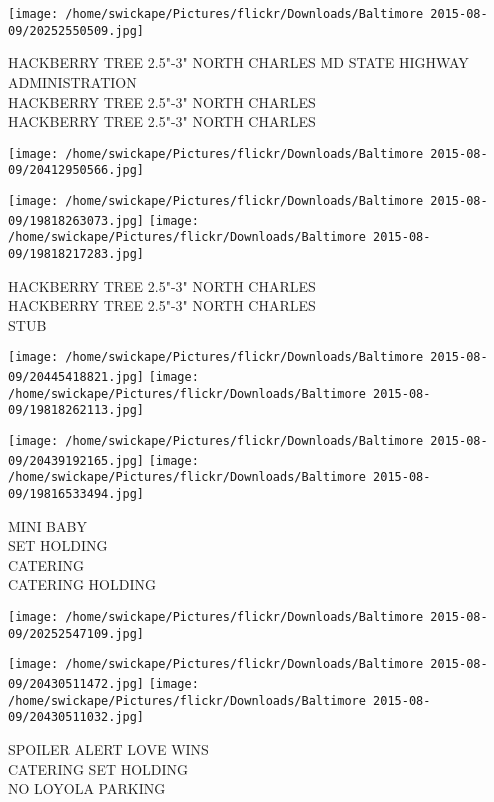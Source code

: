 \documentclass[10pt,letterpaper]{article}
\begin{document}
\texttt{[image: /home/swickape/Pictures/flickr/Downloads/Baltimore 2015-08-09/20252550509.jpg]}

HACKBERRY TREE 2.5"{-}3" NORTH CHARLES MD STATE HIGHWAY ADMINISTRATION\\
HACKBERRY TREE 2.5"{-}3" NORTH CHARLES\\
HACKBERRY TREE 2.5"{-}3" NORTH CHARLES\\
\pagebreak

\texttt{[image: /home/swickape/Pictures/flickr/Downloads/Baltimore 2015-08-09/20412950566.jpg]}

\vspace{0.25in}
\texttt{[image: /home/swickape/Pictures/flickr/Downloads/Baltimore 2015-08-09/19818263073.jpg]}
\texttt{[image: /home/swickape/Pictures/flickr/Downloads/Baltimore 2015-08-09/19818217283.jpg]}

HACKBERRY TREE 2.5"{-}3" NORTH CHARLES\\
HACKBERRY TREE 2.5"{-}3" NORTH CHARLES\\
STUB\\
\pagebreak

\texttt{[image: /home/swickape/Pictures/flickr/Downloads/Baltimore 2015-08-09/20445418821.jpg]}
\texttt{[image: /home/swickape/Pictures/flickr/Downloads/Baltimore 2015-08-09/19818262113.jpg]}

\texttt{[image: /home/swickape/Pictures/flickr/Downloads/Baltimore 2015-08-09/20439192165.jpg]}
\texttt{[image: /home/swickape/Pictures/flickr/Downloads/Baltimore 2015-08-09/19816533494.jpg]}

MINI BABY\\
SET HOLDING\\
CATERING\\
CATERING HOLDING\\
\pagebreak

\texttt{[image: /home/swickape/Pictures/flickr/Downloads/Baltimore 2015-08-09/20252547109.jpg]}

\vspace{0.25in}
\texttt{[image: /home/swickape/Pictures/flickr/Downloads/Baltimore 2015-08-09/20430511472.jpg]}
\texttt{[image: /home/swickape/Pictures/flickr/Downloads/Baltimore 2015-08-09/20430511032.jpg]}

SPOILER ALERT LOVE WINS\\
CATERING SET HOLDING\\
NO LOYOLA PARKING\\
\pagebreak
\end{document}
